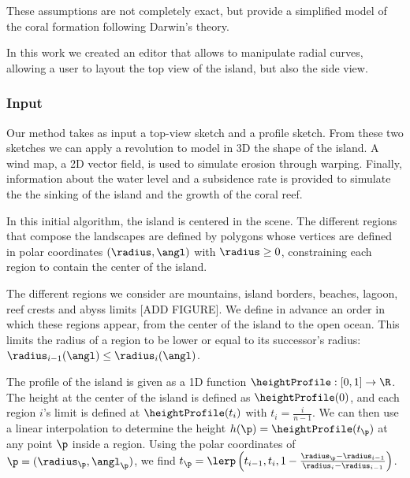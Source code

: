 These assumptions are not completely exact, but provide a simplified model of the coral formation following Darwin's theory.

In this work we created an editor that allows to manipulate radial curves, allowing a user to layout the top view of the island, but also the side view.


\subsubsection{Input}
Our method takes as input a top-view sketch and a profile sketch. From these two sketches we can apply a revolution to model in 3D the shape of the island. A wind map, a 2D vector field, is used to simulate erosion through warping. Finally, information about the water level and a subsidence rate is provided to simulate the the sinking of the island and the growth of the coral reef.

In this initial algorithm, the island is centered in the scene. The different regions that compose the landscapes are defined by polygons whose vertices are defined in polar coordinates $(\radius, \angl)$ with $\radius \geq 0$, constraining each region to contain the center of the island. 

The different regions we consider are mountains, island borders, beaches, lagoon, reef crests and abyss limits [ADD FIGURE]. We define in advance an order in which these regions appear, from the center of the island to the open ocean. This limits the radius of a region to be lower or equal to its successor's radius: $\radius_{i-1}(\angl) \leq \radius_{i}(\angl)$. 

The profile of the island is given as a 1D function $\heightProfile: [0, 1] \to \R$. The height at the center of the island is defined as $\heightProfile(0)$, and each region $i$'s limit is defined at $\heightProfile(t_i)$ with $t_i = \frac{i}{n - 1}$. We can then use a linear interpolation to determine the height $h(\p) = \heightProfile(t_{\p})$ at any point $\p$ inside a region. Using the polar coordinates of $\p = (\radius_{\p}, \angl_{\p})$, we find $t_\p = \lerp \left( t_{i-1}, t_i, 1 - \frac{\radius_{\p} - \radius_{i-1}}{\radius_i - \radius_{i-1}} \right)$.

